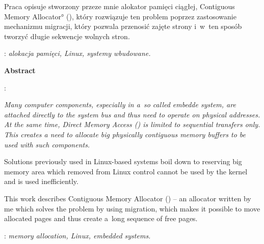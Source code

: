 \begin{titlepage}
{      Praca opisuje stworzony przeze mnie alokator pamięci ciągłej,
      \ang{Contiguous Memory Allocator} (), który rozwiązuje ten
      problem poprzez zastosowanie mechanizmu migracji, który pozwala
      przenosić zajęte strony i~w~ten sposób tworzyć długie sekwencje
      wolnych stron.}

    \vspace*{1\baselineskip}

    : {\itshape alokacja pamięci, Linux,
      systemy wbudowane.}
    \par
    \vspace{4\baselineskip}
    \begin{center}
        {\large\bfseries Abstract}\par\bigskip
    \end{center}
    : {\itshape \theengishtitle}\par
    \vspace*{1\baselineskip}

    {\itshape Many computer components, especially in a~so called
      embedde system, are attached directly to the system bus and thus
      need to operate on physical addresses.  At the same time, Direct
      Memory Access () is limited to sequential transfers only.
      This creates a need to allocate big physically contiguous memory
      buffers to be used with such components.

      Solutions previously used in Linux-based systems boil down to
      reserving big memory area which removed from Linux control
      cannot be used by the kernel and is used inefficiently.

      This work describes Contiguous Memory Allocator () -- an
      allocator written by me which solves the problem by using
      migration, which makes it possible to move allocated pages and
      thus create a~long sequence of free pages.}
    \vspace*{1\baselineskip}

    : {\itshape memory allocation, Linux,
      embedded systems.}

\end{titlepage}
